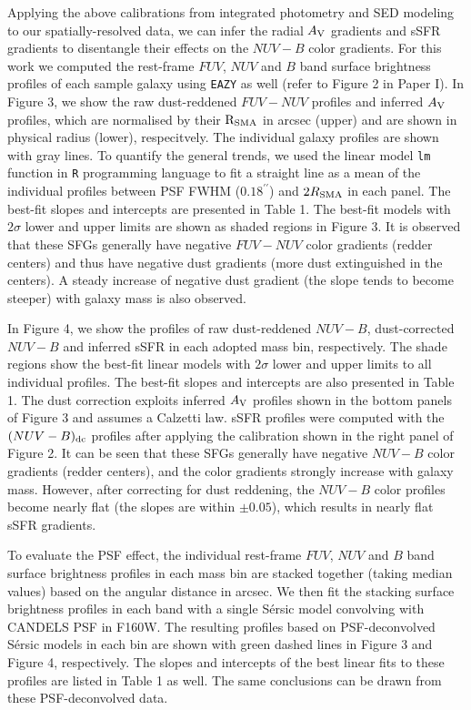 \documentclass[twocolumn]{aastex61}
\begin{document}
Applying the above calibrations from integrated photometry and SED modeling 
to our spatially-resolved data, we can infer the radial $A_{\rm V}$ gradients and 
sSFR gradients to disentangle their effects on the $NUV-B$ color gradients. 
%
For this work we computed the rest-frame $FUV$, $NUV$ and $B$ band surface brightness profiles of each 
sample galaxy using {\tt EAZY} \citep[][]{Brammer+08} as well (refer to Figure 2 in Paper I). 
%
In Figure 3, we show the raw dust-reddened $FUV-NUV$ profiles and 
inferred $A_{\rm V}$ profiles, which are normalised by their $\rm R_{SMA}$ in 
arcsec (upper) and are shown in physical radius (lower), respecitvely.
The individual galaxy profiles are shown with gray lines. 
%
To quantify the general trends, we used the linear model {\tt lm} function  
in {\tt R} programming language to fit a straight line as a mean of
the individual profiles between PSF FWHM ($0.18^{\prime\prime}$) and $2R_{\rm SMA}$ in each panel. 
The best-fit slopes and intercepts are presented in Table 1. 
The best-fit models with $2\sigma$ lower and upper limits are shown as shaded regions 
in Figure 3.
It is observed that these SFGs generally 
have negative $FUV-NUV$ color gradients (redder centers) and thus have negative dust gradients 
(more dust extinguished in the centers). A steady increase of negative dust gradient 
(the slope tends to become steeper) with galaxy mass is also observed. 

In Figure 4, we show the profiles of raw dust-reddened $NUV-B$, 
dust-corrected $NUV-B$ and inferred sSFR in each adopted mass bin, respectively. 
The shade regions show the best-fit linear models with $2\sigma$ lower and upper limits 
to all individual profiles. The best-fit slopes and intercepts are also presented 
in Table 1. 
The dust correction exploits inferred $A_{\rm V}$ profiles shown in the bottom panels of Figure 3 
and assumes a Calzetti law.
sSFR profiles were computed with the $(NUV-B)_{\rm dc}$ profiles 
after applying the calibration shown in the right panel of Figure 2. 
%
It can be seen that these SFGs generally have negative $NUV-B$ 
color gradients (redder centers), and the color gradients strongly increase 
with galaxy mass. However, after correcting for dust reddening, 
the $NUV-B$ color profiles become nearly flat (the slopes are within $\pm0.05$), 
which results in nearly flat sSFR gradients. 

To evaluate the PSF effect, the individual rest-frame $FUV$, $NUV$ and $B$ 
band surface brightness profiles in each mass bin are stacked together (taking median 
values) based on the angular distance in arcsec. We then fit the stacking 
surface brightness profiles in each band with a single S\'ersic model convolving 
with CANDELS PSF in F160W. The resulting profiles based on 
PSF-deconvolved S\'ersic models in each bin are shown with green dashed lines in 
Figure 3 and Figure 4, respectively. The slopes and intercepts of the best linear fits to 
these profiles are listed in Table 1 as well.  
The same conclusions can be drawn from these PSF-deconvolved data.
\end{document}
